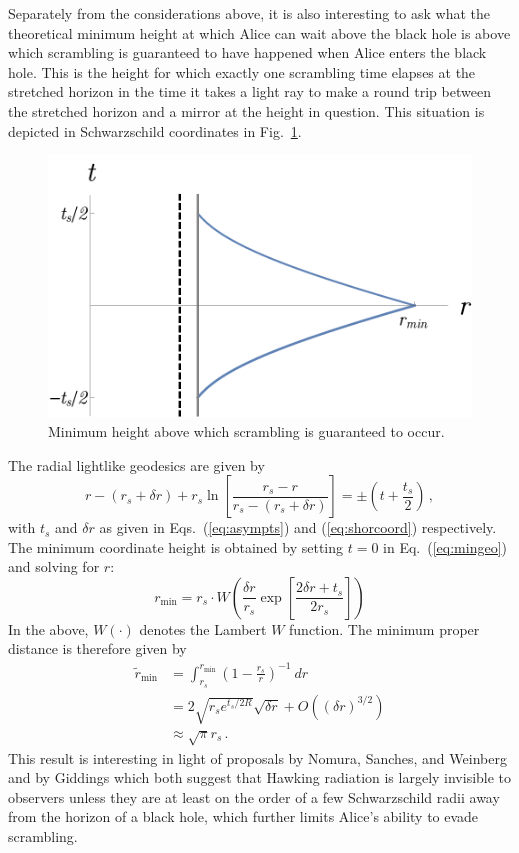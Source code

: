 \documentclass[a4paper,11pt]{article}
\theoremstyle{definition}
\newcommand{\Eq}[1]{Eq.~(\ref{#1})}
\newcommand{\Eqs}[2]{Eqs.~(\ref{#1}) and (\ref{#2})}
\newcommand{\Fig}[1]{Fig.~\ref{#1}}
\begin{document}
Separately from the considerations above, it is also interesting to ask what the theoretical minimum height at which Alice can wait above the black hole is above which scrambling is guaranteed to have happened when Alice enters the black hole.
This is the height for which exactly one scrambling time elapses at the stretched horizon in the time it takes a light ray to make a round trip between the stretched horizon and a mirror at the height in question.
This situation is depicted in Schwarzschild coordinates in \Fig{fig:minheight}.

\begin{figure}
\centering
\includegraphics[scale=0.5]{minheight.pdf}
\caption{Minimum height above which scrambling is guaranteed to occur.}
\label{fig:minheight}
\end{figure}

The radial lightlike geodesics are given by
\begin{equation} \label{eq:mingeo}
r - ({r_s}+\delta r) + {r_s} \ln\left[ \frac{{r_s}-r}{{r_s}-({r_s}+\delta r)} \right] = \pm \left(t + \frac{t_s}{2}\right) \, ,
\end{equation}
with $t_s$ and $\delta r$ as given in \Eqs{eq:asympts}{eq:shorcoord} respectively.
The minimum coordinate height is obtained by setting $t=0$ in \Eq{eq:mingeo} and solving for $r$:
\begin{equation}
r_\mathrm{min} = {r_s} \cdot W\left(\frac{\delta r}{{r_s}} \exp\left[\frac{2 \delta r + t_s}{2{r_s}} \right] \right)
\end{equation}
In the above, $W(\cdot)$ denotes the Lambert $W$ function.
The minimum proper distance is therefore given by
\begin{align}
\nonumber \tilde{r}_\mathrm{min} &= \int_{r_s}^{r_\mathrm{min}} \left(1-\frac{{r_s}}{r}\right)^{-1}~dr \\[2mm]
\nonumber &= 2 \sqrt{{r_s} e^{t_s/2R}} \sqrt{\delta r} + O\left((\delta r)^{3/2}\right) \\[2mm]
&\approx \sqrt{\pi} {r_s} \, .
\end{align}
This result is interesting in light of proposals by Nomura, Sanches, and Weinberg \cite{Nomura:2014voa} and by Giddings \cite{Giddings:2015uzr} which both suggest that Hawking radiation is largely invisible to observers unless they are at least on the order of a few Schwarzschild radii away from the horizon of a black hole, which further limits Alice's ability to evade scrambling.
\end{document}
